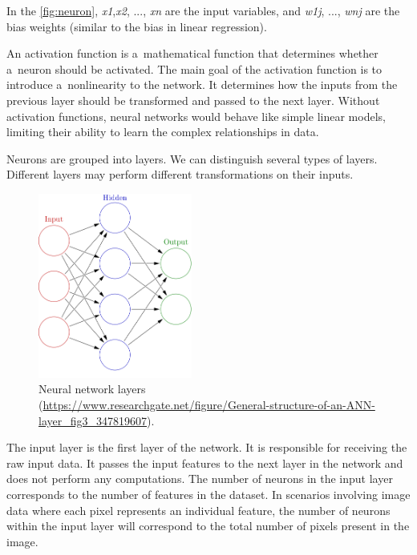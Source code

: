 In the \autoref{fig:neuron}, \textit{x1},\textit{x2}, ..., \textit{xn} are the input variables, and \textit{w1j}, ..., \textit{wnj} are the bias weights (similar to the bias in linear regression).
 
An activation function is a~mathematical function that determines whether a~neuron should be activated. The main goal of the activation function is to introduce a~nonlinearity to the network. It determines how the inputs from the previous layer should be transformed and passed to the next layer. Without activation functions, neural networks would behave like simple linear models, limiting their ability to learn the complex relationships in data.

\medskip

Neurons are grouped into layers. We can distinguish several types of layers. Different layers may perform different transformations on their inputs.

\begin{figure}[htbp]
    \centering
    \includegraphics[width=0.45\textwidth]{obrazky-figures/02-theoretical-basis/Colored_neural_network.png}
    \caption{Neural network layers (\url{https://www.researchgate.net/figure/General-structure-of-an-ANN-layer\_fig3\_347819607}).}
    \label{fig:layers}
\end{figure}


The input layer is the first layer of the network. It is responsible for receiving the raw input data. It passes the input features to the next layer in the network and does not perform any computations. The number of neurons in the input layer corresponds to the number of features in the dataset. In scenarios involving image data where each pixel represents an individual feature, the number of neurons within the input layer will correspond to the total number of pixels present in the image.


